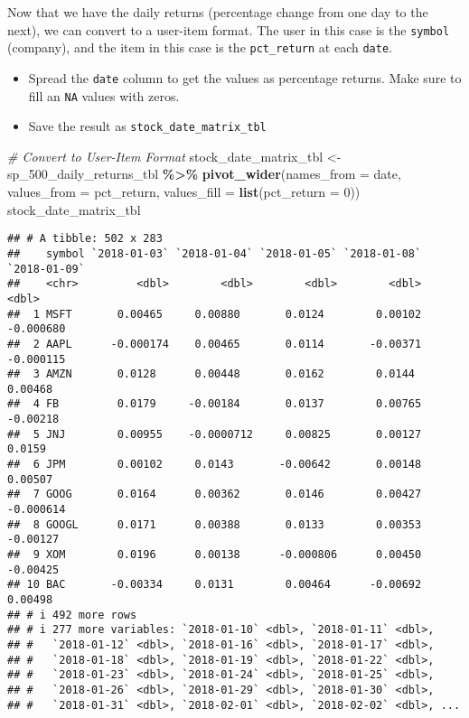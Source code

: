 \documentclass[
]{article}
\newenvironment{Shaded}{\begin{snugshade}}{\end{snugshade}}
\newcommand{\AttributeTok}[1]{\textcolor[rgb]{0.13,0.29,0.53}{#1}}
\newcommand{\CommentTok}[1]{\textcolor[rgb]{0.56,0.35,0.01}{\textit{#1}}}
\newcommand{\DecValTok}[1]{\textcolor[rgb]{0.00,0.00,0.81}{#1}}
\newcommand{\FunctionTok}[1]{\textcolor[rgb]{0.13,0.29,0.53}{\textbf{#1}}}
\newcommand{\NormalTok}[1]{#1}
\newcommand{\OtherTok}[1]{\textcolor[rgb]{0.56,0.35,0.01}{#1}}
\newcommand{\SpecialCharTok}[1]{\textcolor[rgb]{0.81,0.36,0.00}{\textbf{#1}}}
\providecommand{\tightlist}{%
  \setlength{\itemsep}{0pt}\setlength{\parskip}{0pt}}
\begin{document}
Now that we have the daily returns (percentage change from one day to
the next), we can convert to a user-item format. The user in this case
is the \texttt{symbol} (company), and the item in this case is the
\texttt{pct\_return} at each \texttt{date}.

\begin{itemize}
\tightlist
\item
  Spread the \texttt{date} column to get the values as percentage
  returns. Make sure to fill an \texttt{NA} values with zeros.
\item
  Save the result as \texttt{stock\_date\_matrix\_tbl}
\end{itemize}

\begin{Shaded}
\begin{Highlighting}[]
\CommentTok{\# Convert to User{-}Item Format}
\NormalTok{stock\_date\_matrix\_tbl }\OtherTok{\textless{}{-}}\NormalTok{ sp\_500\_daily\_returns\_tbl }\SpecialCharTok{\%\textgreater{}\%} 
    \FunctionTok{pivot\_wider}\NormalTok{(}\AttributeTok{names\_from =}\NormalTok{ date,}
                \AttributeTok{values\_from =}\NormalTok{ pct\_return,}
                \AttributeTok{values\_fill =} \FunctionTok{list}\NormalTok{(}\AttributeTok{pct\_return =} \DecValTok{0}\NormalTok{))}
\NormalTok{stock\_date\_matrix\_tbl}
\end{Highlighting}
\end{Shaded}

\begin{verbatim}
## # A tibble: 502 x 283
##    symbol `2018-01-03` `2018-01-04` `2018-01-05` `2018-01-08` `2018-01-09`
##    <chr>         <dbl>        <dbl>        <dbl>        <dbl>        <dbl>
##  1 MSFT       0.00465     0.00880       0.0124        0.00102    -0.000680
##  2 AAPL      -0.000174    0.00465       0.0114       -0.00371    -0.000115
##  3 AMZN       0.0128      0.00448       0.0162        0.0144      0.00468 
##  4 FB         0.0179     -0.00184       0.0137        0.00765    -0.00218 
##  5 JNJ        0.00955    -0.0000712     0.00825       0.00127     0.0159  
##  6 JPM        0.00102     0.0143       -0.00642       0.00148     0.00507 
##  7 GOOG       0.0164      0.00362       0.0146        0.00427    -0.000614
##  8 GOOGL      0.0171      0.00388       0.0133        0.00353    -0.00127 
##  9 XOM        0.0196      0.00138      -0.000806      0.00450    -0.00425 
## 10 BAC       -0.00334     0.0131        0.00464      -0.00692     0.00498 
## # i 492 more rows
## # i 277 more variables: `2018-01-10` <dbl>, `2018-01-11` <dbl>,
## #   `2018-01-12` <dbl>, `2018-01-16` <dbl>, `2018-01-17` <dbl>,
## #   `2018-01-18` <dbl>, `2018-01-19` <dbl>, `2018-01-22` <dbl>,
## #   `2018-01-23` <dbl>, `2018-01-24` <dbl>, `2018-01-25` <dbl>,
## #   `2018-01-26` <dbl>, `2018-01-29` <dbl>, `2018-01-30` <dbl>,
## #   `2018-01-31` <dbl>, `2018-02-01` <dbl>, `2018-02-02` <dbl>, ...
\end{verbatim}
\end{document}
